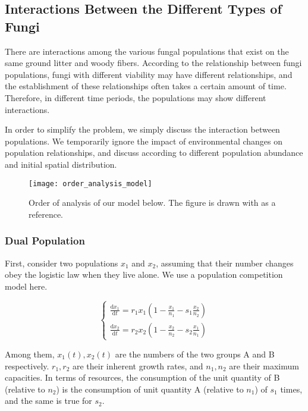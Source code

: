\documentclass{mcmthesis}
\begin{document}
\subsection{Interactions Between the Different Types of Fungi}

There are interactions among the various fungal populations that exist on the same ground litter and woody fibers. According to the relationship between fungi populations, fungi with different viability may have different relationships, and the establishment of these relationships often takes a certain amount of time. Therefore, in different time periods, the populations may show different interactions.

In order to simplify the problem, we simply discuss the interaction between populations. We temporarily ignore the impact of environmental changes on population relationships, and discuss according to different population abundance and initial spatial distribution. 

\begin{figure}[H]
  \small
  \centering
  \texttt{[image: order\_analysis\_model]}
  \caption{Order of analysis of our model below. The figure is drawn with \cite{hiscox2018fungus} as a reference.}
  \label{order_analysis_model}
\end{figure}

\subsubsection*{Dual Population}

First, consider two populations $ x_1 $ and $ x_2 $, assuming that their number changes obey the logistic law when they live alone. We use a population competition model here.

\begin{equation}
  \left\{ \begin{array}{l} \frac{\mathrm{d} x_1}{\mathrm{d} t}=r_{1} x_1\left(1-\frac{x_1}{n_{1}}-s_{1} \frac{x_2}{n_{2}}\right)\\ \frac{\mathrm{d} x_2}{\mathrm{d} t}=r_{2} x_2\left(1-\frac{x_2}{n_{2}}-s_{2} \frac{x_1}{n_{1}}\right) \end{array} \right.
  \label{alg_dual}
\end{equation}

Among them, $ x_1(t), x_2(t) $ are the numbers of the two groups A and B respectively. $ r_1, r_2 $ are their inherent growth rates, and $ n_1, n_2 $ are their maximum capacities. In terms of resources, the consumption of the unit quantity of B (relative to $n_2$) is the consumption of unit quantity A (relative to $n_1$) of $s_1$ times, and the same is true for $s_2$. 
\end{document}
